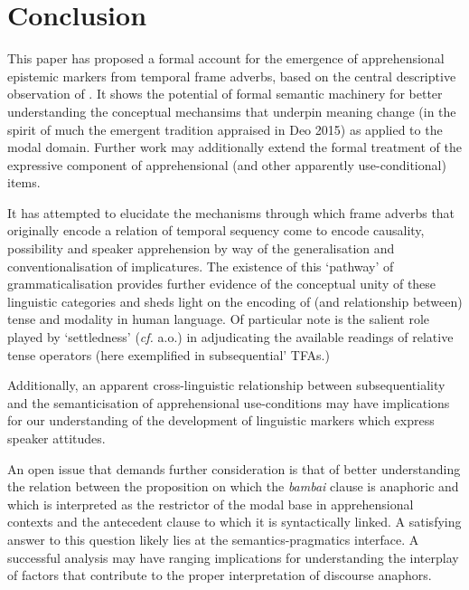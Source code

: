 \documentclass[11pt]{article}
\begin{document}
\section{Conclusion}\label{conclS}

This paper has proposed a formal account for the emergence of apprehensional epistemic markers from temporal frame adverbs, based on the central descriptive observation of \cite{Angelo2016}. It shows the potential of formal semantic machinery for better understanding the conceptual mechansims that underpin meaning change (in the spirit of much the emergent tradition appraised in Deo 2015) as applied to the modal domain. Further work may additionally extend the formal treatment of the expressive component of apprehensional (and other apparently use-conditional) items.


It has attempted to elucidate the mechanisms through which frame adverbs that originally encode a relation of temporal sequency come to encode causality, possibility and speaker apprehension by way of the generalisation and conventionalisation of implicatures. The existence of this `pathway' of grammaticalisation provides further evidence of the conceptual unity of these linguistic categories and sheds light on the encoding of (and relationship between) tense and modality in human language. Of particular note is the salient role played by `settledness' (\textit{cf.} \citealp{Condoravdi2002} a.o.) in adjudicating the available readings of relative tense operators (here exemplified in subsequential' TFAs.)

Additionally, an apparent cross-linguistic relationship between subsequentiality and the semanticisation of apprehensional use-conditions may have implications for our understanding of the development of linguistic markers which express speaker attitudes.

An open issue that demands further consideration is that of better understanding the relation between the proposition on which the \textit{bambai} clause is anaphoric and which is interpreted as the restrictor of the modal base in apprehensional contexts and the antecedent clause to which it is syntactically linked. A satisfying answer to this question likely lies at the semantics-pragmatics interface. A successful analysis may have ranging implications for understanding the interplay of factors that contribute to the proper interpretation of discourse anaphors.
\gathertags

\end{document}
